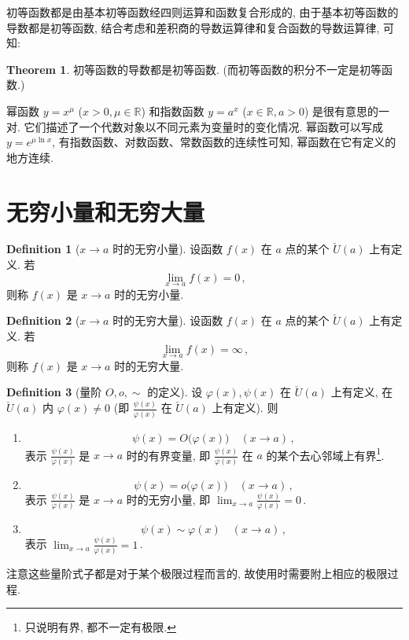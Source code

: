 \documentclass{book}
\newcommand{\e}{e}%
\newcommand{\R}{\mathbb{R}}
\newcommand{\puncU}[1]{\check{U}\!\left( #1 \right)}
\numberwithin{equation}{section}
\numberwithin{figure}{section}
\theoremstyle{definition}
\newtheorem{definition}{Definition}
\newtheorem{theorem}{Theorem}[section]
\begin{document}
初等函数都是由基本初等函数经四则运算和函数复合形成的, 由于基本初等函数的导数都是初等函数, 结合考虑和差积商的导数运算律和复合函数的导数运算律, 可知:
\begin{theorem}
  初等函数的导数都是初等函数. (而初等函数的积分不一定是初等函数.)
\end{theorem}

幂函数 $y=x^\mu$ ($x>0,\mu\in\R$) 和指数函数 $y=a^x$ ($x\in\R,a>0$) 是很有意思的一对. 它们描述了一个代数对象以不同元素为变量时的变化情况. 幂函数可以写成 $y=\e^{\mu\ln x}$, 有指数函数、对数函数、常数函数的连续性可知, 幂函数在它有定义的地方连续.

\section{无穷小量和无穷大量}
\begin{definition}[$x\to a$ 时的无穷小量]
  设函数 $f(x)$ 在 $a$ 点的某个 $\puncU{a}$ 上有定义. 若
  \begin{equation*}
    \lim_{x\to a}f(x)=0\,,
  \end{equation*}
  则称 $f(x)$ 是 $x\to a$ 时的无穷小量.
\end{definition}
\begin{definition}[$x\to a$ 时的无穷大量]
  设函数 $f(x)$ 在 $a$ 点的某个 $\puncU{a}$ 上有定义. 若
  \begin{equation*}
    \lim_{x\to a}f(x)=\infty\,,
  \end{equation*}
  则称 $f(x)$ 是 $x\to a$ 时的无穷大量.
\end{definition}
\begin{definition}[量阶 $O,o,\sim$ 的定义]
  \leavevmode

  设 $\varphi(x),\psi(x)$ 在 $\puncU{a}$ 上有定义, 在 $\puncU{a}$ 内 $\varphi(x)\neq0$ (即 $\frac{\psi(x)}{\varphi(x)}$ 在 $\puncU{a}$ 上有定义). 则
  \begin{enumerate}
    \item 
      \begin{equation*}
	\psi(x)=O\big(\varphi(x)\big)\quad(x\to a)\,,
      \end{equation*}
      表示 $\frac{\psi(x)}{\varphi(x)}$ 是 $x\to a$ 时的有界变量, 即 $\frac{\psi(x)}{\varphi(x)}$ 在 $a$ 的某个去心邻域上有界\footnote{只说明有界, 都不一定有极限.}.
    \item 
      \begin{equation*}
	\psi(x)=o\big(\varphi(x)\big) \quad(x\to a)\,,
      \end{equation*}
      表示 $\frac{\psi(x)}{\varphi(x)}$ 是 $x\to a$ 时的无穷小量, 即 $\lim_{x\to a}\frac{\psi(x)}{\varphi(x)}=0$\,.
    \item 
      \begin{equation*}
	\psi(x)\sim\varphi(x)\quad(x\to a)\,,
      \end{equation*}
      表示 $\lim_{x\to a}\frac{\psi(x)}{\varphi(x)}=1$\,.
  \end{enumerate}
\end{definition}
注意这些量阶式子都是对于某个极限过程而言的, 故使用时需要附上相应的极限过程.
\end{document}
